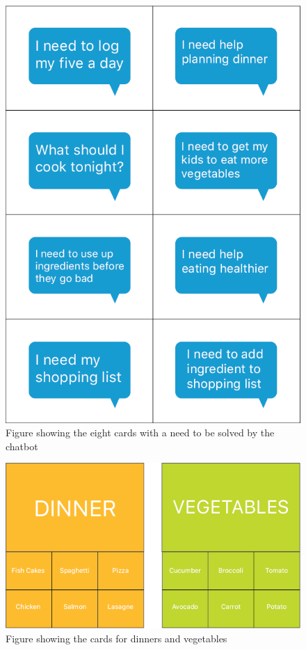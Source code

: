    \begin{figure}[h]
            \centering
            \includegraphics[scale=0.5]{figures/userneeds.png}
            \caption{Figure showing the eight cards with a need to be solved by the chatbot}
            \label{fig:userneed}
        \end{figure}
        
    \begin{figure}[h]
            \centering
            \includegraphics[scale=0.5]{figures/dinnerveg.png}
            \caption{Figure showing the cards for dinners and vegetables}
            \label{fig:dinnerveg}
        \end{figure}
        

